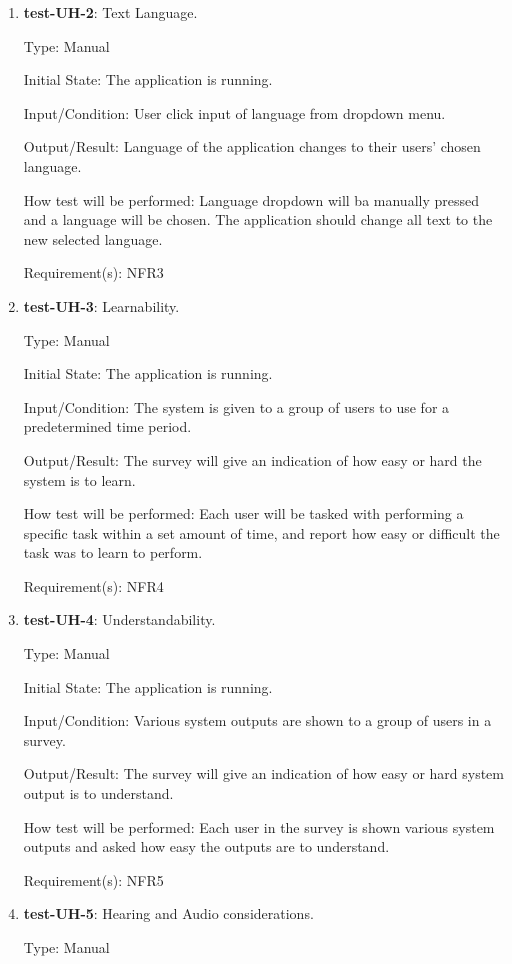 \documentclass[12pt, titlepage]{article}
\begin{document}
\begin{enumerate}
		\item{\textbf{test-UH-2}}: Text Language.
		
		Type: Manual
		
		Initial State: The application is running.
		
		Input/Condition: User click input of language from dropdown menu.

		Output/Result: Language of the application changes to their users' chosen language.
		
		How test will be performed: Language dropdown will ba manually pressed and a language will be chosen. The application should change all text to the new selected language.
		
		Requirement(s): NFR3
		
		\item{\textbf{test-UH-3}}: Learnability.
		
		Type: Manual
		
		Initial State: The application is running.
		
		Input/Condition: The system is given to a group of users to use for a predetermined time period.
		
		Output/Result: The survey will give an indication of how easy or hard the system is to learn.
		
		How test will be performed: Each user will be tasked with performing a specific task within a set amount of time, and report how easy or difficult the task was to learn to perform.
		
		Requirement(s): NFR4
		
		\item{\textbf{test-UH-4}}: Understandability.
		
		Type: Manual

		Initial State: The application is running.
		
		Input/Condition: Various system outputs are shown to a group of users in a survey.
		
		Output/Result: The survey will give an indication of how easy or hard system output is to understand.
		
		How test will be performed: Each user in the survey is shown various system outputs and asked how easy the outputs are to understand.
		
		Requirement(s): NFR5
		
		\item{\textbf{test-UH-5}}: Hearing and Audio considerations.
		
		Type: Manual
		

\end{enumerate}
\end{document}
